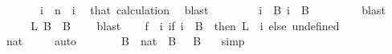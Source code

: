 \begin{isabellebody}
\ \ \ \ \ \ \ {\isachardoublequoteopen}i\ {\isacharless}{\kern0pt}\ n{\isachardoublequoteclose}\ \ i\ \isamarkupfalse%
\ that\ calculation\ \isamarkupfalse%
\ blast\isanewline
\ \ \ \ \isamarkupfalse%
\ \isamarkupfalse%
\ {\isacharasterisk}{\kern0pt}{\isacharasterisk}{\kern0pt}{\isacharcolon}{\kern0pt}\ {\isachardoublequoteopen}{\isasymforall}i\ {\isasymin}\ {\isacharquery}{\kern0pt}B{}{\isachardot}{\kern0pt}\ i\ {\isasymnotin}\ {\isacharquery}{\kern0pt}B{}{\isachardoublequoteclose}\ \isanewline
\ \ \ \ \ \ \isamarkupfalse%
\ blast\isanewline
\ \ \isacommand{{\isacharbraceright}{\kern0pt}}\isamarkupfalse%
\isanewline
\ \ \isamarkupfalse%
\ \isamarkupfalse%
\ L{}{\isacharcolon}{\kern0pt}\ {\isachardoublequoteopen}{\isacharquery}{\kern0pt}B{}\ {\isasyminter}\ {\isacharquery}{\kern0pt}B{}\ {\isacharequal}{\kern0pt}\ {\isacharbraceleft}{\kern0pt}{\isacharbraceright}{\kern0pt}{\isachardoublequoteclose}\ \isamarkupfalse%
\ blast\isanewline
\isanewline
\ \ \isamarkupfalse%
\ {\isacharquery}{\kern0pt}f\ {\isacharequal}{\kern0pt}\ {\isachardoublequoteopen}{\isacharparenleft}{\kern0pt}{\isasymlambda}i{\isachardot}{\kern0pt}\ if\ i\ {\isasymin}\ B\ {}\ then\ L\ {}\ i\ else\ undefined{\isacharparenright}{\kern0pt}{\isachardoublequoteclose}\isanewline
\ \ \isacommand{{\isacharbraceleft}{\kern0pt}}\isamarkupfalse%
\isanewline
\ \ \ \ \isamarkupfalse%
\ {\isachardoublequoteopen}{\isacharbraceleft}{\kern0pt}{\isachardot}{\kern0pt}{\isachardot}{\kern0pt}{}{\isacharcolon}{\kern0pt}{\isacharcolon}{\kern0pt}nat{\isacharbraceright}{\kern0pt}\ {\isacharequal}{\kern0pt}\ {\isacharbraceleft}{\kern0pt}{}{\isacharcomma}{\kern0pt}\ {}{\isacharbraceright}{\kern0pt}{\isachardoublequoteclose}\ \isamarkupfalse%
\ auto\isanewline
\ \ \ \ \isamarkupfalse%
\ \isamarkupfalse%
\ {\isachardoublequoteopen}{\isasymUnion}{\isacharparenleft}{\kern0pt}B\ {\isacharbackquote}{\kern0pt}\ {\isacharbraceleft}{\kern0pt}{\isachardot}{\kern0pt}{\isachardot}{\kern0pt}{}{\isacharcolon}{\kern0pt}{\isacharcolon}{\kern0pt}nat{\isacharbraceright}{\kern0pt}{\isacharparenright}{\kern0pt}\ {\isacharequal}{\kern0pt}\ B\ {}\ {\isasymunion}\ B\ {}{\isachardoublequoteclose}\ \isamarkupfalse%
\ simp\isanewline

\end{isabellebody}
